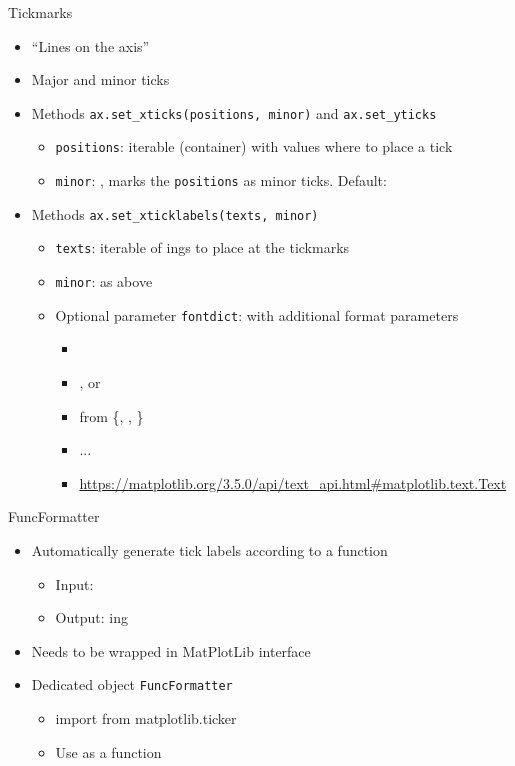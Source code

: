 \begin{frame}[fragile]{Tickmarks}
%
\begin{itemize}
\item \enquote{Lines on the axis}
\item Major and minor ticks
\item Methods \texttt{ax.set\_xticks(positions, minor)} and \texttt{ax.set\_yticks}
	\begin{itemize}
	\item \texttt{positions}: iterable (container) with values where to place a tick
	\item \texttt{minor}: , marks the \texttt{positions} as minor ticks. Default: 
	\end{itemize}
\item Methods \texttt{ax.set\_xticklabels(texts, minor)}
	\begin{itemize}
	\item \texttt{texts}: iterable of ings to place at the tickmarks
	\item \texttt{minor}: as above
	\item Optional parameter \texttt{fontdict}:  with additional format parameters
		\begin{itemize}
		\item {} \thus {}
		\item {} \thus {}, \eg {} or 
		\item {} \thus {} from \{, ,  \}
		\item ...
		\item \url{https://matplotlib.org/3.5.0/api/text_api.html#matplotlib.text.Text}
		\end{itemize}
	\end{itemize}
\end{itemize}
%
\end{frame}


\begin{frame}[fragile]{FuncFormatter}
%
\begin{itemize}
\item Automatically generate tick labels according to a function
	\begin{itemize}
	\item Input: 
	\item Output: ing
	\end{itemize}
\item Needs to be wrapped in MatPlotLib interface
\item Dedicated object \texttt{FuncFormatter}
	\begin{itemize}
	\item import from matplotlib.ticker
	\item Use as a function
	\end{itemize}
\end{itemize}
%
\end{frame}

